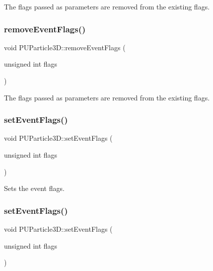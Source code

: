 The flags passed as parameters are removed from the existing flags. \mbox{\label{structPUParticle3D_a561b071d395cd92b8ea688acda6aa12a}} 
\subsubsection{\texorpdfstring{remove\+Event\+Flags()}{removeEventFlags()}\hspace{0.1cm}{\footnotesize\ttfamily [2/2]}}
{\footnotesize\ttfamily void P\+U\+Particle3\+D\+::remove\+Event\+Flags (\begin{DoxyParamCaption}\item[{unsigned int}]{flags }\end{DoxyParamCaption})\hspace{0.3cm}{\ttfamily [inline]}}

The flags passed as parameters are removed from the existing flags. \mbox{\label{structPUParticle3D_a5110d80e36a32b2d5161dd2a5a5e8fb7}} 
\subsubsection{\texorpdfstring{set\+Event\+Flags()}{setEventFlags()}\hspace{0.1cm}{\footnotesize\ttfamily [1/2]}}
{\footnotesize\ttfamily void P\+U\+Particle3\+D\+::set\+Event\+Flags (\begin{DoxyParamCaption}\item[{unsigned int}]{flags }\end{DoxyParamCaption})\hspace{0.3cm}{\ttfamily [inline]}}

Sets the event flags. \mbox{\label{structPUParticle3D_a5110d80e36a32b2d5161dd2a5a5e8fb7}} 
\subsubsection{\texorpdfstring{set\+Event\+Flags()}{setEventFlags()}\hspace{0.1cm}{\footnotesize\ttfamily [2/2]}}
{\footnotesize\ttfamily void P\+U\+Particle3\+D\+::set\+Event\+Flags (\begin{DoxyParamCaption}\item[{unsigned int}]{flags }\end{DoxyParamCaption})\hspace{0.3cm}{\ttfamily [inline]}}

